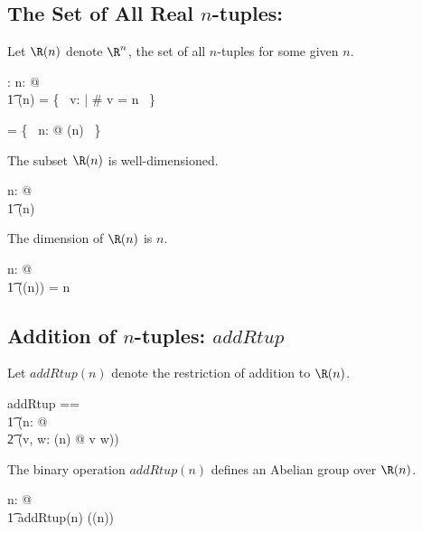 \documentclass{amsart}
\begin{document}
\subsection{The Set of All Real $n$-tuples: }

Let $\Rtup(n)$ denote $\R^n$, the set of all $n$-tuples for some given $n$.
\begin{axdef}
	\Rtup: \nat \fun \power \Rinf
\where
	\forall n: \nat @ \\
	\t1	\Rtup(n) = \{~ v: \Rinf | \# v = n ~\}
\end{axdef}

\begin{remark}

\begin{zed}
	\Rinf = \bigcup \{~ n: \nat @ \Rtup(n) ~\}
\end{zed}

\end{remark}

\begin{remark}
The subset $\Rtup(n)$ is well-dimensioned.

\begin{zed}
	\forall n: \nat @ \\
	\t1	\Rtup(n) \in \DeltaRinf
\end{zed}

\end{remark}

\begin{remark}
The dimension of $\Rtup(n)$ is $n$.

\begin{zed}
	\forall n: \nat @ \\
	\t1	\dimRinf(\Rtup(n)) = n
\end{zed}

\end{remark}

\subsection{Addition of $n$-tuples: $addRtup$}

Let $addRtup(n)$ denote the restriction of addition to $\Rtup(n)$.

\begin{zed}
addRtup == \\
\t1	(\lambda n: \nat @ \\
\t2		(\lambda v, w: \Rtup(n) @ v \addRinf w))
\end{zed}

\begin{example}
The binary operation $addRtup(n)$ defines an Abelian group over $\Rtup(n)$.

\begin{zed}
\forall n: \nat @ \\
\t1	addRtup(n) \in \abgroup(\Rtup(n))
\end{zed}

\end{example}
\end{document}
